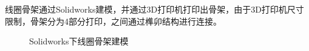 ﻿\documentclass[UTF-8,a4paper,12pt]{ctexart}
\begin{document}
                    线圈骨架通过Solidworks建模，并通过3D打印机打印出骨架，由于3D打印机尺寸限制，骨架分为4部分打印，之间通过榫卯结构进行连接。
                        \begin{figure}[htbp]
                        \centering %
                        \caption{Solidworks下线圈骨架建模} %
                        \label{Solidworks下线圈骨架建模}         %
                        \end{figure}
        
\end{document}
